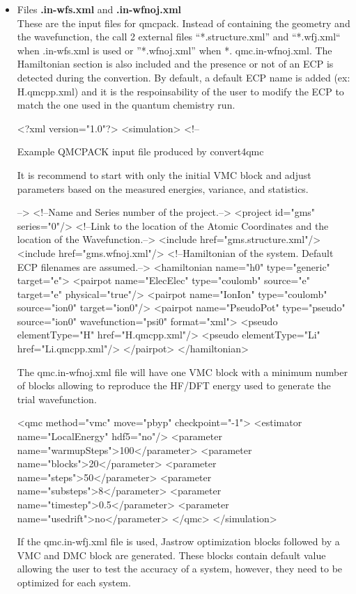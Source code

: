 \begin{itemize}
 \item Files \textbf{.in-wfs.xml} and \textbf{.in-wfnoj.xml} \\
 These are the input files for qmcpack. Instead of containing the geometry and the wavefunction, the call 2 external files ``*.structure.xml'' and ``*.wfj.xml`` when .in-wfs.xml is used or ''*.wfnoj.xml'' when *. qmc.in-wfnoj.xml. The Hamiltonian section is also included and the presence or not of an ECP is detected during the convertion. By default, a default ECP name is added (ex: H.qmcpp.xml) and it is the respoinsability of the user to modify the ECP to match the one used in the quantum chemistry run.\\
  \begin{shade}
  <?xml version="1.0"?>
<simulation>
  <!--
 
Example QMCPACK input file produced by convert4qmc
 
It is recommend to start with only the initial VMC block and adjust
parameters based on the measured energies, variance, and statistics.

-->
  <!--Name and Series number of the project.-->
  <project id="gms" series="0"/>
  <!--Link to the location of the Atomic Coordinates and the location of 
      the Wavefunction.-->
  <include href="gms.structure.xml"/>
  <include href="gms.wfnoj.xml"/>
  <!--Hamiltonian of the system. Default ECP filenames are assumed.-->
  <hamiltonian name="h0" type="generic" target="e">
    <pairpot name="ElecElec" type="coulomb" source="e" target="e" 
                                                   physical="true"/>
    <pairpot name="IonIon" type="coulomb" source="ion0" target="ion0"/>
    <pairpot name="PseudoPot" type="pseudo" source="ion0" wavefunction="psi0" 
                                                           format="xml">
      <pseudo elementType="H" href="H.qmcpp.xml"/>
      <pseudo elementType="Li" href="Li.qmcpp.xml"/>
    </pairpot>
  </hamiltonian>

 \end{shade}

 The qmc.in-wfnoj.xml file will have one VMC block with a minimum number of blocks allowing to reproduce the HF/DFT energy used to generate the trial wavefunction.
 
 \begin{shade}
  <qmc method="vmc" move="pbyp" checkpoint="-1">
    <estimator name="LocalEnergy" hdf5="no"/>
    <parameter name="warmupSteps">100</parameter>
    <parameter name="blocks">20</parameter>
    <parameter name="steps">50</parameter>
    <parameter name="substeps">8</parameter>
    <parameter name="timestep">0.5</parameter>
    <parameter name="usedrift">no</parameter>
  </qmc>
</simulation>
 \end{shade}
If the qmc.in-wfj.xml file is used, Jastrow optimization blocks followed by a VMC and DMC block are generated. These blocks contain default value allowing the user to test the accuracy of a system, however, they need to be optimized for each system. 


\end{itemize}
